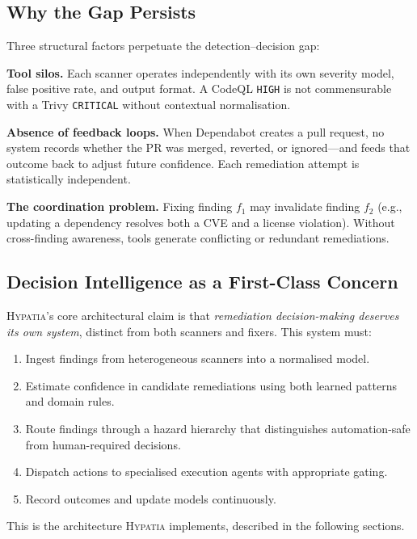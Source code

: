 \documentclass[11pt,a4paper]{article}
\begin{document}
\subsection{Why the Gap Persists}

Three structural factors perpetuate the detection--decision gap:

\textbf{Tool silos.} Each scanner operates independently with its own severity model, false positive rate, and output format. A CodeQL \texttt{HIGH} is not commensurable with a Trivy \texttt{CRITICAL} without contextual normalisation.

\textbf{Absence of feedback loops.} When Dependabot creates a pull request, no system records whether the PR was merged, reverted, or ignored---and feeds that outcome back to adjust future confidence. Each remediation attempt is statistically independent.

\textbf{The coordination problem.} Fixing finding $f_1$ may invalidate finding $f_2$ (e.g., updating a dependency resolves both a CVE and a license violation). Without cross-finding awareness, tools generate conflicting or redundant remediations.

\subsection{Decision Intelligence as a First-Class Concern}

\textsc{Hypatia}'s core architectural claim is that \emph{remediation decision-making deserves its own system}, distinct from both scanners and fixers. This system must:

\begin{enumerate}[nosep]
  \item Ingest findings from heterogeneous scanners into a normalised model.
  \item Estimate confidence in candidate remediations using both learned patterns and domain rules.
  \item Route findings through a hazard hierarchy that distinguishes automation-safe from human-required decisions.
  \item Dispatch actions to specialised execution agents with appropriate gating.
  \item Record outcomes and update models continuously.
\end{enumerate}

\noindent This is the architecture \textsc{Hypatia} implements, described in the following sections.
\end{document}
